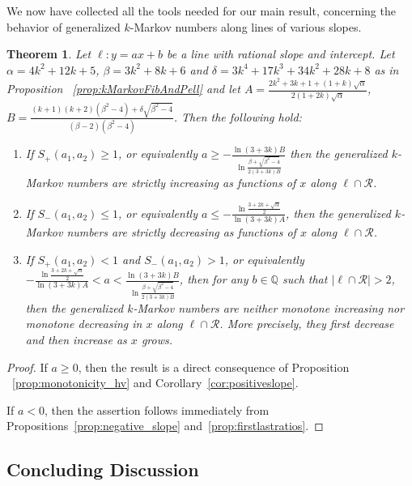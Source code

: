 \documentclass{article}
\newtheorem{theorem}{Theorem}
\theoremstyle{remark}
\begin{document}
We now have collected all the tools needed for our main result, concerning the behavior of generalized $k$-Markov numbers along lines of various slopes.

\begin{theorem}\label{thm:Main}
Let $\ell:y=ax+b$ be a line with rational slope and intercept. 
Let $\alpha = 4k^2 + 12k + 5$, $\beta= 3k^2 + 8k + 6$ and $\delta= 3k^4 + 17k^3 + 34 k^2 + 28k + 8$ as in Proposition ~\ref{prop:kMarkovFibAndPell} and let $A= \frac{2k^2 + 3k + 1 + (1+k)\sqrt{\alpha}}{2(1+2k)\sqrt{\alpha}}$, $B=\frac{(k+1)(k+2)(\beta^2-4)+\delta\sqrt{\beta^2-4}}{(\beta-2)(\beta^2-4)}$. Then the following hold:
\begin{enumerate}
    \item[$(1)$] If $S_+(a_1,a_2)\geq 1$, or equivalently $a \geq -\frac{\ln(3+3k)B}{\ln\frac{\beta+\sqrt{\beta^2-4}}{2(3+3k)B}}$
    then the generalized $k$-Markov numbers are strictly increasing as functions of $x$ along $\ell\cap \mathcal R$. 

    \item[$(2)$] If $S_-(a_1,a_2)\leq 1$, or equivalently $a\leq -\frac{\ln\frac{3+2k+\sqrt{\alpha}}{2}}{\ln(3+3k)A}$,
    then the generalized $k$-Markov numbers are strictly decreasing as functions of $x$ along $\ell\cap \mathcal R$. 

    \item[$(3)$] If $S_+(a_1,a_2)<1$ and $S_-(a_1,a_2)>1$, or equivalently $-\frac{\ln\frac{3+2k+\sqrt{\alpha}}{2}}{\ln(3+3k)A} < a < \frac{\ln(3+3k)B}{\ln\frac{\beta+\sqrt{\beta^2-4}}{2(3+3k)B}}$, then for any 
    $b\in \mathbb Q$ such that $|\ell\cap \mathcal R|>2$, then
    the generalized $k$-Markov numbers are neither monotone increasing nor monotone decreasing in $x$ along $\ell\cap \mathcal R$. More precisely, they first decrease and then increase as $x$ grows.
\end{enumerate}
\end{theorem}
    
\begin{proof}
If $a\geq 0$, then the result is a direct consequence of Proposition ~\ref{prop:monotonicity_hv} and Corollary~\ref{cor:positiveslope}.

If  $a<0$, then the assertion follows immediately from Propositions~\ref{prop:negative_slope} and~\ref{prop:firstlastratios}.
\end{proof}

\subsection{Concluding Discussion}
\end{document}
